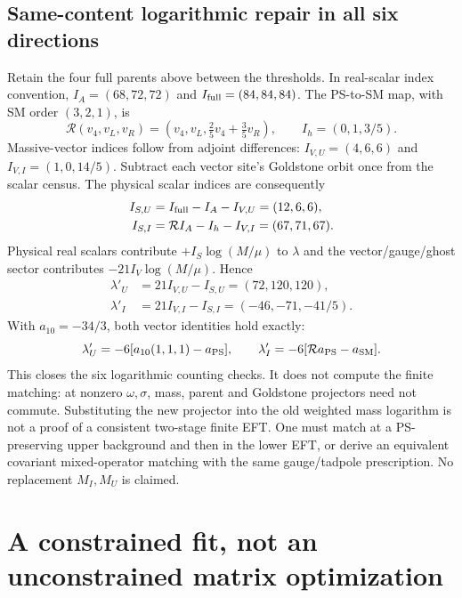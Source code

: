 \documentclass[11pt]{article}
\begin{document}
\subsection{Same-content logarithmic repair in all six directions}
Retain the four full parents above between the thresholds. In real-scalar
index convention, $I_A=(68,72,72)$ and $I_{\rm full}=(84,84,84)$.
The PS-to-SM map, with SM order $(3,2,1)$, is
\begin{equation}
 \mathcal R(v_4,v_L,v_R)=(v_4,v_L,\tfrac25v_4+\tfrac35v_R),\qquad
 I_h=(0,1,3/5).
\end{equation}
Massive-vector indices follow from adjoint differences:
$I_{V,U}=(4,6,6)$ and $I_{V,I}=(1,0,14/5)$. Subtract each vector site's
Goldstone orbit once from the scalar census. The physical scalar indices
are consequently
\begin{align}
 I_{S,U}&=I_{\rm full}-I_A-I_{V,U}=(12,6,6),\\
 I_{S,I}&=\mathcal R I_A-I_h-I_{V,I}=(67,71,67).
\end{align}
Physical real scalars contribute $+I_S\log(M/\mu)$ to $\lambda$ and the
vector/gauge/ghost sector contributes $-21I_V\log(M/\mu)$. Hence
\begin{align}
 \lambda'_U&=21I_{V,U}-I_{S,U}=(72,120,120),\\
 \lambda'_I&=21I_{V,I}-I_{S,I}=(-46,-71,-41/5).
\end{align}
With $a_{10}=-34/3$, both vector identities hold exactly:
\begin{equation}
 \lambda'_U=-6[a_{10}(1,1,1)-a_{\rm PS}],\qquad
 \lambda'_I=-6[\mathcal R a_{\rm PS}-a_{\rm SM}].
\end{equation}
This closes the six logarithmic counting checks. It does not compute the
finite matching: at nonzero $\omega,\sigma$, mass, parent and Goldstone
projectors need not commute. Substituting the new projector into the old
weighted mass logarithm is not a proof of a consistent two-stage finite
EFT. One must match at a PS-preserving upper background and then in the
lower EFT, or derive an equivalent covariant mixed-operator matching with
the same gauge/tadpole prescription. No replacement $M_I,M_U$ is claimed.

\section{A constrained fit, not an unconstrained matrix optimization}
\end{document}
